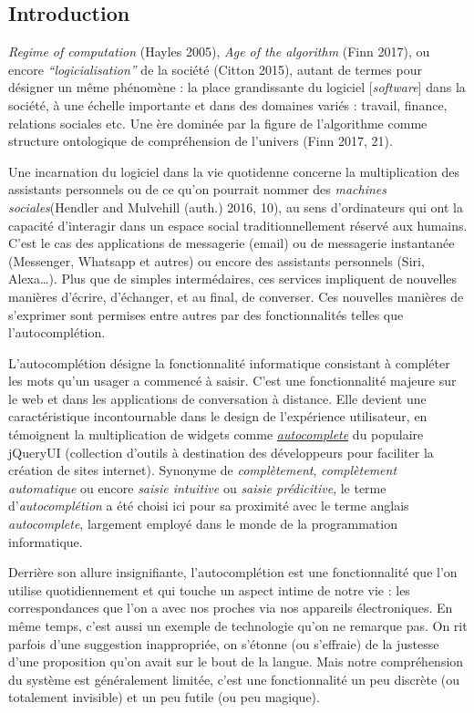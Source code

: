 \documentclass[]{article}
\begin{document}
\newpage

\hypertarget{introduction}{%
\subsection{Introduction}\label{introduction}}

\emph{Regime of computation} (Hayles 2005), \emph{Age of the algorithm}
(Finn 2017), ou encore \emph{``logicialisation''} de la société (Citton
2015), autant de termes pour désigner un même phénomène : la place
grandissante du logiciel {[}\emph{software}{]} dans la société, à une
échelle importante et dans des domaines variés : travail, finance,
relations sociales etc. Une ère dominée par la figure de l'algorithme
comme structure ontologique de compréhension de l'univers (Finn 2017,
21).

Une incarnation du logiciel dans la vie quotidenne concerne la
multiplication des assistants personnels ou de ce qu'on pourrait nommer
des \emph{machines sociales}(Hendler and Mulvehill (auth.) 2016, 10), au
sens d'ordinateurs qui ont la capacité d'interagir dans un espace social
traditionnellement réservé aux humains. C'est le cas des applications de
messagerie (email) ou de messagerie instantanée (Messenger, Whatsapp et
autres) ou encore des assistants personnels (Siri, Alexa\ldots{}). Plus
que de simples intermédaires, ces services impliquent de nouvelles
manières d'écrire, d'échanger, et au final, de converser. Ces nouvelles
manières de s'exprimer sont permises entre autres par des
fonctionnalités telles que l'autocomplétion.

L'autocomplétion désigne la fonctionnalité informatique consistant à
compléter les mots qu'un usager a commencé à saisir. C'est une
fonctionnalité majeure sur le web et dans les applications de
conversation à distance. Elle devient une caractéristique incontournable
dans le design de l'expérience utilisateur, en témoignent la
multiplication de widgets comme
\href{http://jqueryui.com/}{\emph{autocomplete}} du populaire jQueryUI
(collection d'outils à destination des développeurs pour faciliter la
création de sites internet). Synonyme de \emph{complètement},
\emph{complètement automatique} ou encore \emph{saisie intuitive} ou
\emph{saisie prédicitive}, le terme d'\emph{autocomplétion} a été choisi
ici pour sa proximité avec le terme anglais \emph{autocomplete},
largement employé dans le monde de la programmation informatique.

Derrière son allure insignifiante, l'autocomplétion est une
fonctionnalité que l'on utilise quotidiennement et qui touche un aspect
intime de notre vie : les correspondances que l'on a avec nos proches
via nos appareils électroniques. En même temps, c'est aussi un exemple
de technologie qu'on ne remarque pas. On rit parfois d'une suggestion
inappropriée, on s'étonne (ou s'effraie) de la justesse d'une
proposition qu'on avait sur le bout de la langue. Mais notre
compréhension du système est généralement limitée, c'est une
fonctionnalité un peu discrète (ou totalement invisible) et un peu
futile (ou peu magique).
\end{document}
